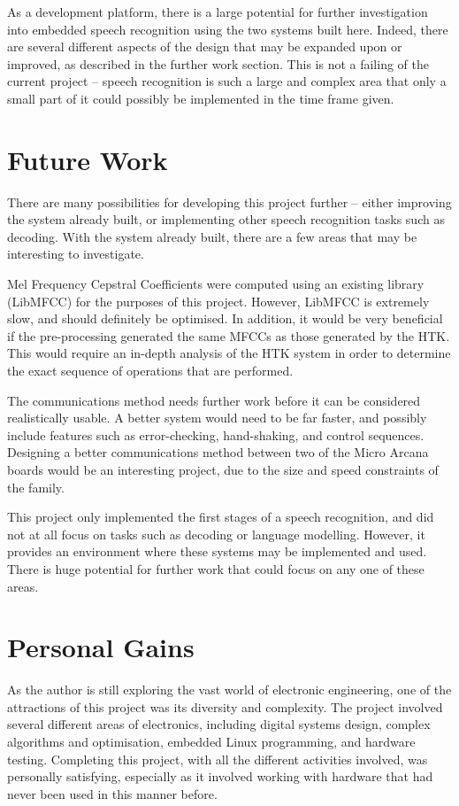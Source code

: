 	As a development platform, there is a large potential for further investigation into embedded speech recognition using the two systems built here.  Indeed, there are several different aspects of the design that may be expanded upon or improved, as described in the further work section.  This is not a failing of the current project -- speech recognition is such a large and complex area that only a small part of it could possibly be implemented in the time frame given.


\section{Future Work} %
\label{sec:future_work}
	There are many possibilities for developing this project further -- either improving the system already built, or implementing other speech recognition tasks such as decoding.  With the system already built, there are a few areas that may be interesting to investigate.

	Mel Frequency Cepstral Coefficients were computed using an existing library (LibMFCC) for the purposes of this project.  However, LibMFCC is extremely slow, and should definitely be optimised.  In addition, it would be very beneficial if the pre-processing generated the same MFCCs as those generated by the HTK.  This would require an in-depth analysis of the HTK system in order to determine the exact sequence of operations that are performed.

	The communications method needs further work before it can be considered realistically usable.  A better system would need to be far faster, and possibly include features such as error-checking, hand-shaking, and control sequences.  Designing a better communications method between two of the Micro Arcana boards would be an interesting project, due to the size and speed constraints of the family.

	This project only implemented the first stages of a speech recognition, and did not at all focus on tasks such as decoding or language modelling.  However, it provides an environment where these systems may be implemented and used.  There is huge potential for further work that could focus on any one of these areas.


\section{Personal Gains} %
\label{sec:personal_gains}
	As the author is still exploring the vast world of electronic engineering, one of the attractions of this project was its diversity and complexity.  The project involved several different areas of electronics, including digital systems design, complex algorithms and optimisation, embedded Linux programming, and hardware testing.  Completing this project, with all the different activities involved, was personally satisfying, especially as it involved working with hardware that had never been used in this manner before.

